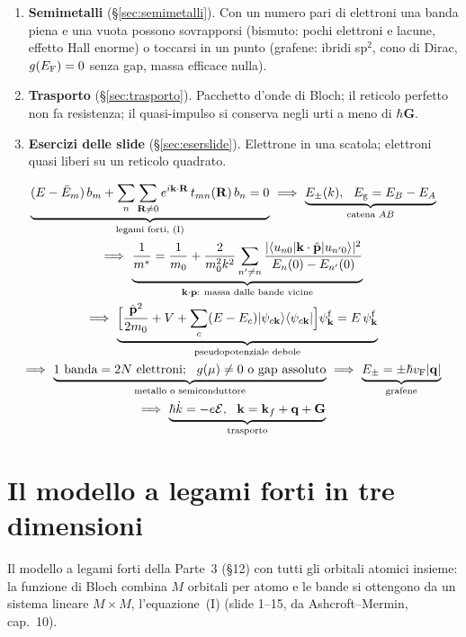 \documentclass[11pt,a4paper]{article}
\begin{document}
\begin{introduzione}
\begin{enumerate}[label=\textbf{\Alph*.}, leftmargin=2.2em]
un metallo.
\item \textbf{Semimetalli} (§\ref{sec:semimetalli}). Con un numero pari di elettroni una banda piena e una vuota possono sovrapporsi (bismuto: pochi
elettroni e lacune, effetto Hall enorme) o toccarsi in un punto (grafene: ibridi sp$^2$, cono di Dirac, $g(E_{\mathrm F})=0$ senza gap, massa efficace nulla).
\item \textbf{Trasporto} (§\ref{sec:trasporto}). Pacchetto d'onde di Bloch; il reticolo perfetto non fa resistenza; il quasi-impulso si conserva negli
urti a meno di $\hbar\mathbf G$.
\item \textbf{Esercizi delle slide} (§\ref{sec:eserslide}). Elettrone in una scatola; elettroni quasi liberi su un reticolo quadrato.
\end{enumerate}
\begin{riepilogo}
\begin{gather*}
\underbrace{(E-\bar E_m)\,b_m+\sum_n\sum_{\vR\ne0}e^{i\vk\cdot\vR}\,t_{mn}(\vR)\,b_n=0}_{\text{legami forti, (I)}}
\ \Longrightarrow\ \underbrace{E_\pm(k),\ \ \Eg=E_B-E_A}_{\text{catena }AB}\\
\Longrightarrow\ \underbrace{\frac1{m^*}=\frac1{m_0}+\frac2{m_0^2k^2}\sum_{n'\ne n}\frac{|\langle u_{n0}|\vk\cdot\hp|u_{n'0}\rangle|^2}{E_n(0)-E_{n'}(0)}}_{\vk\cdot\mathbf p:\ \text{massa dalle bande vicine}}
\\
\Longrightarrow\ \underbrace{\Bigl[\frac{\hp^2}{2m_0}+V+\sum_c(E-E_c)|\psi_{c\vk}\rangle\langle\psi_{c\vk}|\Bigr]\psi^{\mathrm f}_{\vk}=E\,\psi^{\mathrm f}_{\vk}}_{\text{pseudopotenziale debole}}\\
\Longrightarrow\ \underbrace{1\ \text{banda}=2N\ \text{elettroni};\ \ g(\mu)\ne0\ \text{o gap assoluto}}_{\text{metallo o semiconduttore}}
\ \Longrightarrow\ \underbrace{E_\pm=\pm\hbar\vF|\vq|}_{\text{grafene}}\\
\Longrightarrow\ \underbrace{\hbar\dot k=-e\mathcal E,\ \ \vk=\vk_f+\vq+\mathbf G}_{\text{trasporto}}
\end{gather*}
\end{riepilogo}
\end{introduzione}

\section{Il modello a legami forti in tre dimensioni}\label{sec:tb3d}
Il modello a legami forti della Parte~3 (§12) con tutti gli orbitali atomici insieme: la funzione di Bloch combina $M$ orbitali per atomo e le bande
si ottengono da un sistema lineare $M\times M$, l'equazione~(I) (slide 1--15, da Ashcroft--Mermin, cap.~10).
\end{document}
